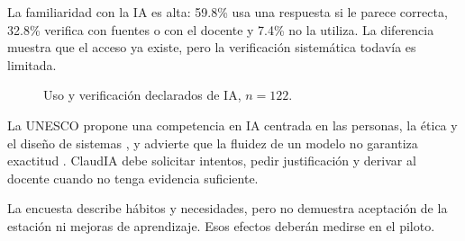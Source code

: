 \documentclass[11pt]{article}
\newcommand{\Section}[1]{\par\vspace{0.16\baselineskip}{\normalfont\normalsize\bfseries\RaggedRight #1\par}}
\newcommand{\Subsection}[1]{\par\vspace{0.12\baselineskip}{\normalfont\normalsize\bfseries\RaggedRight #1\par\vspace{0.07\baselineskip}}}
\begin{document}
\Section{Relación de los estudiantes con la IA}

La familiaridad con la IA es alta: 59.8\% usa una respuesta si le parece correcta, 32.8\% verifica con fuentes o con el docente y 7.4\% no la utiliza. La diferencia muestra que el acceso ya existe, pero la verificación sistemática todavía es limitada.

\begin{figure}[H]
\centering
{}
\caption{Uso y verificación declarados de IA, $n=122$.}
\end{figure}

La UNESCO propone una competencia en IA centrada en las personas, la ética y el diseño de sistemas \cite{miao2024}, y advierte que la fluidez de un modelo no garantiza exactitud \cite{unesco2024guide}. ClaudIA debe solicitar intentos, pedir justificación y derivar al docente cuando no tenga evidencia suficiente.

\Subsection{Alcance de los datos}
La encuesta describe hábitos y necesidades, pero no demuestra aceptación de la estación ni mejoras de aprendizaje. Esos efectos deberán medirse en el piloto.

\clearpage

\Section{Límites de la evidencia y validación necesaria}
\end{document}
